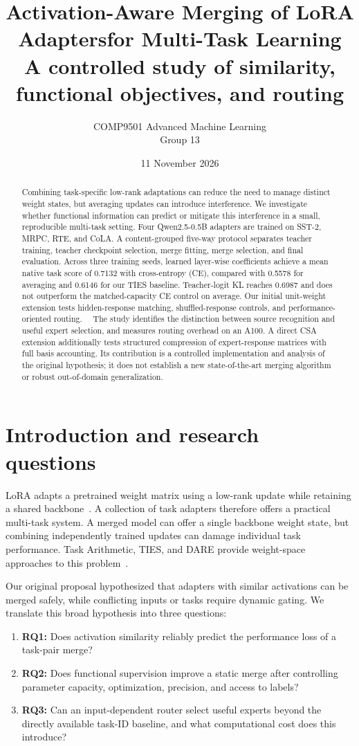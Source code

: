 \documentclass[11pt,a4paper]{article}
\title{Activation-Aware Merging of LoRA Adapters\newline for Multi-Task Learning\\[5pt]
\large A controlled study of similarity, functional objectives, and routing}
\author{COMP9501 Advanced Machine Learning\\Group 13}
\date{11 November 2026}
\begin{document}
\maketitle
\begin{abstract}
Combining task-specific low-rank adaptations can reduce the need to manage distinct weight states, but averaging updates can introduce interference. We investigate whether functional information can predict or mitigate this interference in a small, reproducible multi-task setting. Four Qwen2.5-0.5B adapters are trained on SST-2, MRPC, RTE, and CoLA. A content-grouped five-way protocol separates teacher training, teacher checkpoint selection, merge fitting, merge selection, and final evaluation. Across three training seeds, learned layer-wise coefficients achieve a mean native task score of 0.7132 with cross-entropy (CE), compared with 0.5578 for averaging and 0.6146 for our TIES baseline. Teacher-logit KL reaches 0.6987 and does not outperform the matched-capacity CE control on average. Our initial unit-weight extension tests hidden-response matching, shuffled-response controls, and performance-oriented routing. \AbstractExtension\ \AbstractVtwo\ The study identifies the distinction between source recognition and useful expert selection, and measures routing overhead on an A100. A direct CSA extension additionally tests structured compression of expert-response matrices with full basis accounting. Its contribution is a controlled implementation and analysis of the original hypothesis; it does not establish a new state-of-the-art merging algorithm or robust out-of-domain generalization.
\end{abstract}

\section{Introduction and research questions}
LoRA adapts a pretrained weight matrix using a low-rank update while retaining a shared backbone~\cite{lora}. A collection of task adapters therefore offers a practical multi-task system. A merged model can offer a single backbone weight state, but combining independently trained updates can damage individual task performance. Task Arithmetic, TIES, and DARE provide weight-space approaches to this problem~\cite{ta,ties,dare}.

Our original proposal hypothesized that adapters with similar activations can be merged safely, while conflicting inputs or tasks require dynamic gating. We translate this broad hypothesis into three questions:
\begin{enumerate}
\item \textbf{RQ1:} Does activation similarity reliably predict the performance loss of a task-pair merge?
\item \textbf{RQ2:} Does functional supervision improve a static merge after controlling parameter capacity, optimization, precision, and access to labels?
\item \textbf{RQ3:} Can an input-dependent router select useful experts beyond the directly available task-ID baseline, and what computational cost does this introduce?
\end{enumerate}
\end{document}
